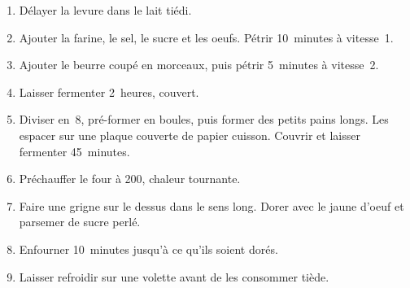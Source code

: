 
\begin{ingredients}
\end{ingredients}


\begin{recipe}
  \begin{enumerate}

  \item Délayer la levure dans le lait tiédi.

  \item Ajouter la farine, le sel, le sucre et les oeufs.  Pétrir
    10~minutes à vitesse~1.

  \item Ajouter le beurre coupé en morceaux, puis pétrir 5~minutes à
    vitesse~2.

  \item Laisser fermenter 2~heures, couvert.

  \item Diviser en~8, pré-former en boules, puis former des petits
    pains longs.  Les espacer sur une plaque couverte de papier
    cuisson.  Couvrir et laisser fermenter 45~minutes.

  \item Préchauffer le four à 200\degreeC{}, chaleur tournante.

  \item Faire une grigne sur le dessus dans le sens long.  Dorer avec
    le jaune d'oeuf et parsemer de sucre perlé.

  \item Enfourner 10~minutes jusqu'à ce qu'ils soient dorés.

  \item Laisser refroidir sur une volette avant de les consommer tiède.

  \end{enumerate}
\end{recipe}


